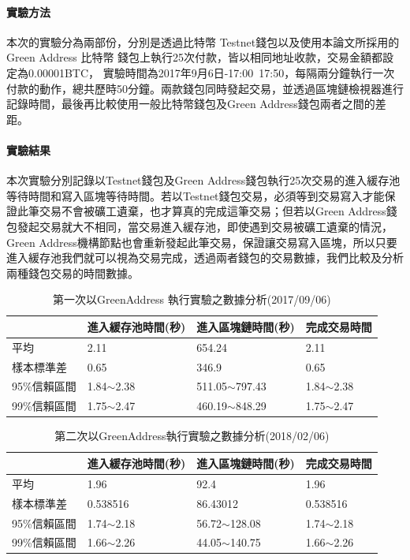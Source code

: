 				\paragraph{實驗方法}本次的實驗分為兩部份，分別是透過比特幣 Testnet錢包以及使用本論文所採用的Green Address 比特幣 錢包上執行25次付款，皆以相同地址收款，交易金額都設定為0.00001BTC， 實驗時間為2017年9月6日-17:00~17:50，每隔兩分鐘執行一次付款的動作，總共歷時50分鐘。兩款錢包同時發起交易，並透過區塊鏈檢視器進行記錄時間，最後再比較使用一般比特幣錢包及Green Address錢包兩者之間的差距。
				\paragraph{實驗結果}本次實驗分別記錄以Testnet錢包及Green Address錢包執行25次交易的進入緩存池等待時間和寫入區塊等待時間。若以Testnet錢包交易，必須等到交易寫入才能保證此筆交易不會被礦工遺棄，也才算真的完成這筆交易；但若以Green Address錢包發起交易就大不相同，當交易進入緩存池，即使遇到交易被礦工遺棄的情況，Green Address機構節點也會重新發起此筆交易，保證讓交易寫入區塊，所以只要進入緩存池我們就可以視為交易完成，透過兩者錢包的交易數據，我們比較及分析兩種錢包交易的時間數據。

				
				\begin{table}[htbp]
				\centering
				\caption{第一次以GreenAddress 執行實驗之數據分析(2017/09/06)}
				\label{1green}
				\begin{tabular}{|l|l|l|l|}
				\hline
				 & 進入緩存池時間(秒) & 進入區塊鏈時間(秒) & 完成交易時間 \\ \hline
				平均 & 2.11 & 654.24 & 2.11 \\ \hline
				樣本標準差 & 0.65 & 346.9 & 0.65 \\ \hline
				95\%信賴區間 & 1.84$\sim$2.38 & 511.05$\sim$797.43 & 1.84$\sim$2.38 \\ \hline
				99\%信賴區間 & 1.75$\sim$2.47 & 460.19$\sim$848.29 & 1.75$\sim$2.47 \\ \hline
				\end{tabular}
				\end{table}

				
				\begin{table}[htbp]
				\centering
				\caption{第二次以GreenAddress執行實驗之數據分析(2018/02/06)}
				\label{2green}
				\begin{tabular}{|l|l|l|l|}
				\hline
				 & 進入緩存池時間(秒) & 進入區塊鏈時間(秒) & 完成交易時間 \\ \hline
				平均 & 1.96 & 92.4 & 1.96 \\ \hline
				樣本標準差 & 0.538516 & 86.43012 & 0.538516 \\ \hline
				95\%信賴區間 & 1.74$\sim$2.18 & 56.72$\sim$128.08 & 1.74$\sim$2.18 \\ \hline
				99\%信賴區間 & 1.66$\sim$2.26 & 44.05$\sim$140.75 & 1.66$\sim$2.26 \\ \hline
				\end{tabular}
				\end{table}


